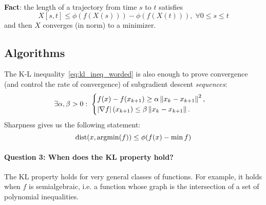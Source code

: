 \textbf{Fact}: the length of a trajectory from time $s$ to $t$ satisfies
\[
	X[s, t] \leq \phi(f(X(s))) - \phi(f(X(t))), \; \forall 0 \leq s \leq t
\]
and then $X$ converges (in norm) to a minimizer.


\subsection{Algorithms}
The K-L inequality~\eqref{eq:kl_ineq_worded} is also enough to prove
convergence (and control the rate of convergence) of subgradient descent
\textit{sequences}:
\[
	\exists \alpha, \beta > 0 : \;
	\begin{cases}
		f(x) - f(x_{k+1}) \geq \alpha \left \| x_k - x_{k+1} \right \|^2,  \\
		\left| \nabla f \right|(x_{k+1}) \leq \beta \left \| x_k - x_{k+1} \right \|.
	\end{cases}
\]
Sharpness gives us the following statement:
\[
	\mathrm{dist}(x, \operatorname*{argmin}(f)) \leq \phi(f(x) - \min f)
\]

\paragraph{Question 3: When does the KL property hold?}
The KL property holds for very general classes of functions. For example, it
holds when $f$ is semialgebraic, i.e. a function whose graph is the
intersection of a set of polynomial inequalities.
